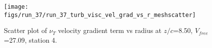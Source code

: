 \begin{figure}[H]
\centering
\texttt{[image: figs/run\_37/run\_37\_turb\_visc\_vel\_grad\_vs\_r\_meshscatter]}
\caption{Scatter plot of $\nu_T$ velocity gradient term vs radius at $z/c$=8.50, $V_{free}$=27.09, station 4.}
\label{fig:run_37_turb_visc_vel_grad_vs_r_meshscatter}
\end{figure}


